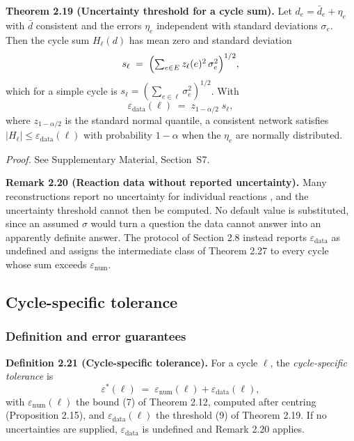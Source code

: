 \documentclass[11pt,a4paper]{article}
\theoremstyle{pstyle}
\theoremstyle{definition}
\theoremstyle{remark}
\newcommand{\abs}[1]{\lvert#1\rvert}
\newcommand{\eps}{\varepsilon}
\newcommand{\epsnum}{\eps_{\mathrm{num}}}
\newcommand{\epsdata}{\eps_{\mathrm{data}}}
\newcommand{\epsstar}{\eps^{\ast}}
\newcommand{\hol}{H}
\begin{document}
\par\noindent\textbf{Theorem 2.19 (Uncertainty threshold for a cycle sum).}\label{thm:data-floor} 
Let $d_e=\bar d_e+\eta_e$ with $\bar d$ consistent and the errors
$\eta_e$ independent with standard deviations $\sigma_e$. Then the cycle
sum $\hol_\ell(d)$ has mean zero and standard deviation
\begin{equation}
  s_\ell \;=\; \Bigl(\textstyle\sum_{e\in E} z_\ell(e)^{2}\,
  \sigma_e^{2}\Bigr)^{1/2},
  \label{eq:data-sd}
\end{equation}
which for a simple cycle is $s_\ell=(\sum_{e\in\ell}\sigma_e^{2})^{1/2}$.
With
\begin{equation}
  \epsdata(\ell) \;=\; z_{1-\alpha/2}\; s_\ell,
  \label{eq:data-floor}
\end{equation}
where $z_{1-\alpha/2}$ is the standard normal quantile, a consistent
network satisfies $\abs{\hol_\ell} \le \epsdata(\ell)$ with probability
$1-\alpha$ when the $\eta_e$ are normally distributed.
\par

\noindent\emph{Proof.} See Supplementary Material, Section~S7.

\par\noindent\textbf{Remark 2.20 (Reaction data without reported uncertainty).}\label{rem:no-sigma} 
Many reconstructions report no uncertainty for individual reactions
\citep{brunk2018,orth2010}, and the uncertainty threshold cannot then be
computed. No default value is substituted, since an assumed $\sigma$
would turn a question the data cannot answer into an apparently definite
answer. The protocol of Section 2.8 instead reports $\epsdata$ as
undefined and assigns the intermediate class of Theorem 2.27 to
every cycle whose sum exceeds $\epsnum$.
\par

\subsection{Cycle-specific tolerance}
\label{sec:tolerance}

\subsubsection{Definition and error guarantees}

\par\noindent\textbf{Definition 2.21 (Cycle-specific tolerance).}\label{def:epsstar} 
For a cycle $\ell$, the \emph{cycle-specific tolerance} is
\begin{equation}
  \epsstar(\ell) \;=\; \epsnum(\ell)+\epsdata(\ell),
  \label{eq:epsstar}
\end{equation}
with $\epsnum(\ell)$ the bound (7) of
Theorem 2.12, computed after centring (Proposition 2.15), and
$\epsdata(\ell)$ the threshold (9) of
Theorem 2.19. If no uncertainties are supplied, $\epsdata$ is
undefined and Remark 2.20 applies.
\par
\end{document}
